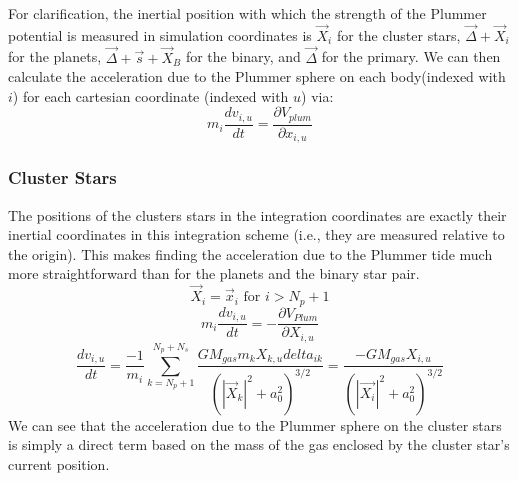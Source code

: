 \documentclass{aastex631}
\begin{document}
For clarification, the inertial position with which the strength of the Plummer potential is measured in simulation coordinates is $\vec{X}_i$ for the cluster stars,
$\vec{\Delta}+\vec{X}_i$ for the planets, $\vec{\Delta}+\vec{s}+\vec{X}_B$ for the binary, and $\vec{\Delta}$ for the primary.
We can then calculate the acceleration due to the Plummer sphere on each body(indexed with $i$) for each cartesian coordinate (indexed with $u$) via:
\begin{equation}
    m_i\frac{dv_{i,u}}{dt} = \frac{\partial V_{plum}}{\partial x_{i,u}}
\end{equation}
\subsubsection{Cluster Stars}
The positions of the clusters stars in the integration coordinates are exactly their inertial coordinates in this integration scheme 
(i.e., they are measured relative to the origin). This makes finding the acceleration due to the Plummer tide much more straightforward 
than for the planets and the binary star pair.
\begin{equation}
    \vec{X}_i = \vec{x}_i \text{  for  } i>N_p+1
\end{equation}
\begin{equation}
    m_i\frac{dv_{i,u}}{dt} = -\frac{\partial V_{Plum}}{\partial X_{i,u}}
\end{equation}
\begin{equation}
    \frac{dv_{i,u}}{dt} = \frac{-1}{m_i}\sum_{k=N_p+1}^{N_p+N_s}\frac{GM_{gas}m_kX_{k,u}delta_{ik}}{(|\vec{X}_k|^2+a_0^2)^{3/2}} = 
    \frac{-GM_{gas}X_{i,u}}{(|\vec{X_i}|^2+a_0^2)^{3/2}}
\end{equation}
We can see that the acceleration due to the Plummer sphere on the cluster stars is simply a direct term based on the mass of the gas 
enclosed by the cluster star's current position.
\end{document}
